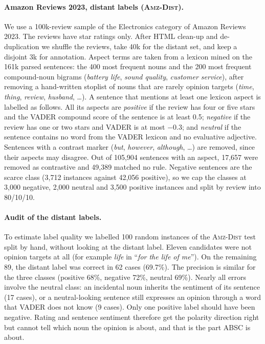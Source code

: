 \documentclass[11pt]{article}
\newcommand{\dist}{\textsc{Amz-Dist}}
\begin{document}
\paragraph{Amazon Reviews 2023, distant labels (\dist).} We use a 100k-review sample of the Electronics category of Amazon Reviews 2023. The reviews have star ratings only. After HTML clean-up and de-duplication we shuffle the reviews, take 40k for the distant set, and keep a disjoint 3k for annotation. Aspect terms are taken from a lexicon mined on the 161k parsed sentences: the 400 most frequent nouns and the 200 most frequent compound-noun bigrams (\textit{battery life}, \textit{sound quality}, \textit{customer service}), after removing a hand-written stoplist of nouns that are rarely opinion targets (\textit{time}, \textit{thing}, \textit{review}, \textit{husband}, \dots). A sentence that mentions at least one lexicon aspect is labelled as follows. All its aspects are \textit{positive} if the review has four or five stars and the VADER compound score \citep{hutto2014vader} of the sentence is at least 0.5; \textit{negative} if the review has one or two stars and VADER is at most $-0.3$; and \textit{neutral} if the sentence contains no word from the VADER lexicon and no evaluative adjective. Sentences with a contrast marker (\textit{but}, \textit{however}, \textit{although}, \dots) are removed, since their aspects may disagree. Out of 105,904 sentences with an aspect, 17,657 were removed as contrastive and 49,389 matched no rule. Negative sentences are the scarce class (3,712 instances against 42,056 positive), so we cap the classes at 3,000 negative, 2,000 neutral and 3,500 positive instances and split by review into 80/10/10.

\paragraph{Audit of the distant labels.} To estimate label quality we labelled 100 random instances of the \dist{} test split by hand, without looking at the distant label. Eleven candidates were not opinion targets at all (for example \textit{life} in ``\textit{for the life of me}''). On the remaining 89, the distant label was correct in 62 cases (69.7\%). The precision is similar for the three classes (positive 68\%, negative 72\%, neutral 69\%). Nearly all errors involve the neutral class: an incidental noun inherits the sentiment of its sentence (17 cases), or a neutral-looking sentence still expresses an opinion through a word that VADER does not know (9 cases). Only one positive label should have been negative. Rating and sentence sentiment therefore get the polarity direction right but cannot tell which noun the opinion is about, and that is the part ABSC is about.
\end{document}

